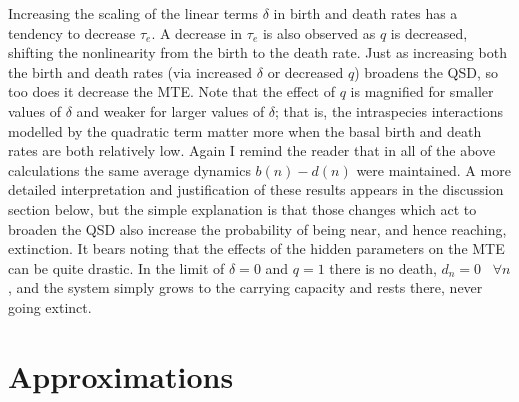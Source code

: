 Increasing the scaling of the linear terms $\delta$ in birth and death rates has a tendency to decrease $\tau_e$. 
A decrease in $\tau_e$ is also observed as $q$ is decreased, shifting the nonlinearity from the birth to the death rate. 
Just as increasing both the birth and death rates (via increased $\delta$ or decreased $q$) broadens the QSD, so too does it decrease the MTE. 
Note that the effect of $q$ is magnified for smaller values of $\delta$ and weaker for larger values of $\delta$; that is, the intraspecies interactions modelled by the quadratic term matter more when the basal birth and death rates are both relatively low. 
Again I remind the reader that in all of the above calculations the same average dynamics $b(n)-d(n)$ were maintained. 
A more detailed interpretation and justification of these results appears in the discussion section below, but the simple explanation is that those changes which act to broaden the QSD also increase the probability of being near, and hence reaching, extinction. 
It bears noting that the effects of the hidden parameters on the MTE can be quite drastic. 
In the limit of $\delta=0$ and $q=1$ there is no death, $d_n=0 \,\text{ }\forall n$, and the system simply grows to the carrying capacity and rests there, never going extinct. 


\section{Approximations}%


